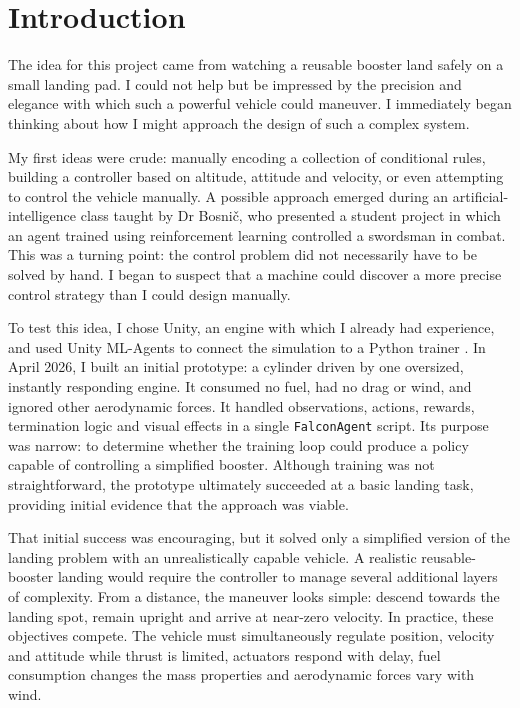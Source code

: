 \chapter{Introduction}
\label{ch:introduction}

The idea for this project came from watching a reusable booster land safely on a small landing pad. I could not help but be impressed by the precision and elegance with which such a powerful vehicle could maneuver. I immediately began thinking about how I might approach the design of such a complex system.

My first ideas were crude: manually encoding a collection of conditional rules, building a controller based on altitude, attitude and velocity, or even attempting to control the vehicle manually. A possible approach emerged during an artificial-intelligence class taught by Dr Bosnič, who presented a student project in which an agent trained using reinforcement learning controlled a swordsman in combat. This was a turning point: the control problem did not necessarily have to be solved by hand. I began to suspect that a machine could discover a more precise control strategy than I could design manually.

To test this idea, I chose Unity, an engine with which I already had experience, and used Unity ML-Agents to connect the simulation to a Python trainer
\cite{juliani2020mlagents,unitymlagentsrepo}. In April 2026, I built an initial prototype: a cylinder driven by one oversized, instantly responding engine. It consumed no fuel, had no drag or wind, and ignored other aerodynamic forces. It handled observations, actions, rewards, termination logic and visual effects in a single \texttt{FalconAgent} script. Its purpose was narrow: to determine whether the training loop could produce a policy capable of controlling a simplified booster. Although training was not straightforward, the prototype ultimately succeeded at a basic landing task, providing initial evidence that the approach was viable.

That initial success was encouraging, but it solved only a simplified version of the landing problem with an unrealistically capable vehicle. A realistic reusable-booster landing would require the controller to manage several additional layers of complexity. From a distance, the maneuver looks simple: descend towards the landing spot, remain upright and arrive at near-zero velocity. In practice, these objectives compete. The vehicle must simultaneously regulate position, velocity and attitude while thrust is limited, actuators respond with delay, fuel consumption changes the mass properties and aerodynamic forces vary with wind.


